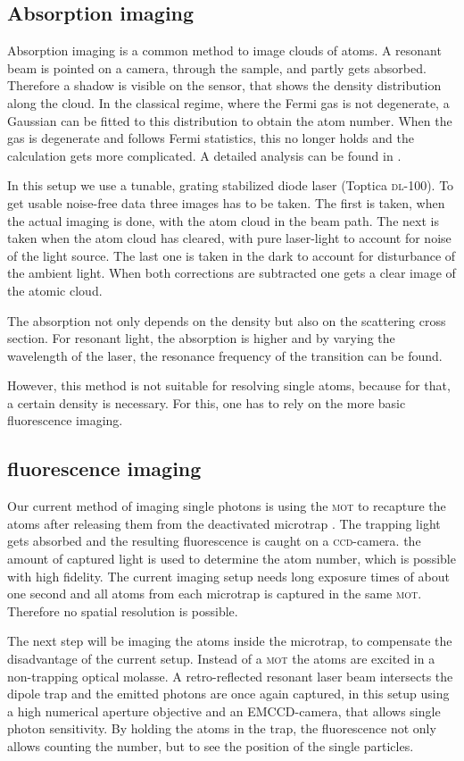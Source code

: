 \subsection{Absorption imaging}

Absorption imaging is a common method to image clouds of atoms\cite{ketterle}. A resonant beam is pointed on a camera, through the sample, and partly gets absorbed. Therefore a shadow is visible on the sensor, that shows the density distribution along the cloud. In the classical regime, where the Fermi gas is not degenerate, a Gaussian can be fitted to this distribution to obtain the atom number. When the gas is degenerate and follows Fermi statistics, this no longer holds and the calculation gets more complicated. A detailed analysis can be found in \cite{ketterle2}.

In this setup we use a tunable, grating stabilized diode laser (Toptica \textsc{dl}-100). To get usable noise-free data three images has to be taken. The first is taken, when the actual imaging is done, with the atom cloud in the beam path. The next is taken when the atom cloud has cleared, with pure laser-light to account for noise of the light source. The last one is taken in the dark to account for disturbance of the ambient light. When both corrections are subtracted one gets a clear image of the atomic cloud.

The absorption not only depends on the density but also on the scattering cross section. For resonant light, the absorption is higher and by varying the wavelength of the laser, the resonance frequency of the transition can be found.

However, this method is not suitable for resolving single atoms, because for that, a certain density is necessary. For this, one has to rely on the more basic fluorescence imaging.

\subsection{fluorescence imaging}

Our current method of imaging single photons is using the \textsc{mot} to recapture the atoms after releasing them from the deactivated microtrap \cite{timo}. The trapping light gets absorbed and the resulting fluorescence is caught on a \textsc{ccd}-camera. the amount of captured light is used to determine the atom number, which is possible with high fidelity. The current imaging setup needs long exposure times of about one second and all atoms from each microtrap is captured in the same \textsc{mot}. Therefore no spatial resolution is possible.

The next step will be imaging the atoms inside the microtrap, to compensate the disadvantage of the current setup. Instead of a \textsc{mot} the atoms are excited in a non-trapping optical molasse. A retro-reflected resonant laser beam intersects the dipole trap and the emitted photons are once again captured, in this setup using a high numerical aperture objective and an EMCCD-camera, that allows single photon sensitivity. By holding the atoms in the trap, the fluorescence not only allows counting the number, but to see the position of the single particles.



